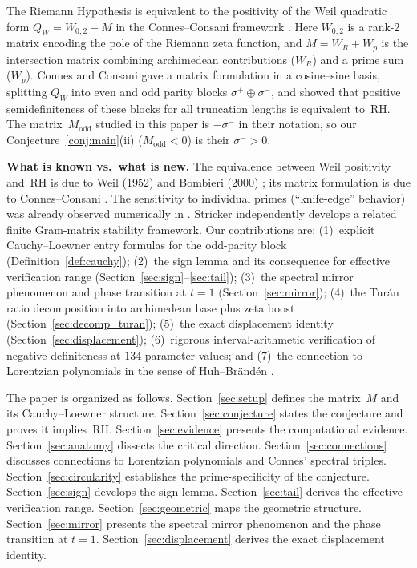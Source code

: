 \documentclass[11pt,a4paper]{article}
\begin{document}
The Riemann Hypothesis is equivalent to the positivity of the Weil quadratic form $Q_W = W_{0,2} - M$ in the Connes--Consani framework \cite{CC2020, CCM2025}. Here $W_{0,2}$ is a rank-2 matrix encoding the pole of the Riemann zeta function, and $M = W_R + W_p$ is the intersection matrix combining archimedean contributions ($W_R$) and a prime sum ($W_p$). Connes and Consani \cite{CC2020} gave a matrix formulation in a cosine--sine basis, splitting $Q_W$ into even and odd parity blocks $\sigma^+ \oplus \sigma^-$, and showed that positive semidefiniteness of these blocks for all truncation lengths is equivalent to~RH. The matrix~$M_{\mathrm{odd}}$ studied in this paper is $-\sigma^-$ in their notation, so our Conjecture~\ref{conj:main}(ii) ($M_{\mathrm{odd}} < 0$) is their $\sigma^- > 0$.

\medskip\noindent\textbf{What is known vs.\ what is new.} The equivalence between Weil positivity and~RH is due to Weil (1952) and Bombieri (2000) \cite{Bombieri2000}; its matrix formulation is due to Connes--Consani \cite{CC2020}. The sensitivity to individual primes (``knife-edge'' behavior) was already observed numerically in \cite{CC2020, CCM2025}. Stricker \cite{Stricker2026} independently develops a related finite Gram-matrix stability framework. Our contributions are: (1)~explicit Cauchy--Loewner entry formulas for the odd-parity block (Definition~\ref{def:cauchy}); (2)~the sign lemma and its consequence for effective verification range (Section~\ref{sec:sign}--\ref{sec:tail}); (3)~the spectral mirror phenomenon and phase transition at $t = 1$ (Section~\ref{sec:mirror}); (4)~the Tur\'an ratio decomposition into archimedean base plus zeta boost (Section~\ref{sec:decomp_turan}); (5)~the exact displacement identity (Section~\ref{sec:displacement}); (6)~rigorous interval-arithmetic verification of negative definiteness at $134$ parameter values; and (7)~the connection to Lorentzian polynomials in the sense of Huh--Br\"and\'en \cite{BH2020}.

The paper is organized as follows. Section~\ref{sec:setup} defines the matrix~$M$ and its Cauchy--Loewner structure. Section~\ref{sec:conjecture} states the conjecture and proves it implies~RH. Section~\ref{sec:evidence} presents the computational evidence. Section~\ref{sec:anatomy} dissects the critical direction. Section~\ref{sec:connections} discusses connections to Lorentzian polynomials and Connes' spectral triples. Section~\ref{sec:circularity} establishes the prime-specificity of the conjecture. Section~\ref{sec:sign} develops the sign lemma. Section~\ref{sec:tail} derives the effective verification range. Section~\ref{sec:geometric} maps the geometric structure. Section~\ref{sec:mirror} presents the spectral mirror phenomenon and the phase transition at $t=1$. Section~\ref{sec:displacement} derives the exact displacement identity.
\end{document}

